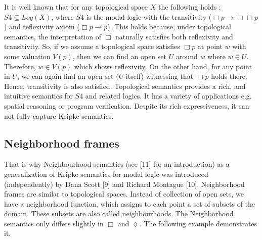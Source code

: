 \documentclass[12pt, a4paper]{scrartcl}
\begin{document}
It is well known that for any topological space $X$ the following holds : $S4 \subseteq Log(X)$, where $S4$ is the modal logic with the transitivity ($\Box p \rightarrow \Box\Box p$) and reflexivity axiom ($\Box p \rightarrow p$). 
This holds because, under topological semantics, the interpretation of $\Box$ naturally satisfies both reflexivity and transitivity. So, if we assume a topological space satisfies $\Box p$ at point $w$ with some valuation $V(p)$,
then we can find an open set  $U$ around $w$ where $w\in U$. Therefore, $w \in V(p)$ which shows reflexivity. On the other hand, for any point in $U$, we can again find an open set ($U$ itself) witnessing that $\Box p$ holds there. Hence, transitivity is also satisfied. \newline
Topological semantics provides a rich, and intuitive semantics for $S4$ and related logics. It has a variety of applications e.g. spatial reasoning or program verification. Despite its rich expressiveness, it can not fully capture Kripke semantics. 
\subsection{Neighborhood frames}That is why Neighbourhood semantics (see [11] for an introduction) as a generalization of Kripke semantics for modal logic was introduced (independently) by Dana Scott [9] and Richard Montague [10].
Neighborhood frames are similar to topological spaces. Instead of collection of open sets, we have a neighborhood function, which assigns to each point a set of subsets of the domain. These subsets are also called neighbourhoods.
The Neighborhood semantics only differs slightly in $\Box$ and $\lozenge$. The following example demonstrates it.
\end{document}
